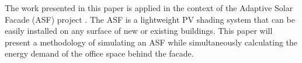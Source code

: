 The work presented in this paper is applied in the context of the Adaptive Solar Facade (ASF) project \cite{nagy2015frontiers}. The ASF is a lightweight PV shading system that can be easily installed on any surface of new or existing buildings. This paper will present a methodology of simulating an ASF while simultaneously calculating the energy demand of the office space behind the facade.











